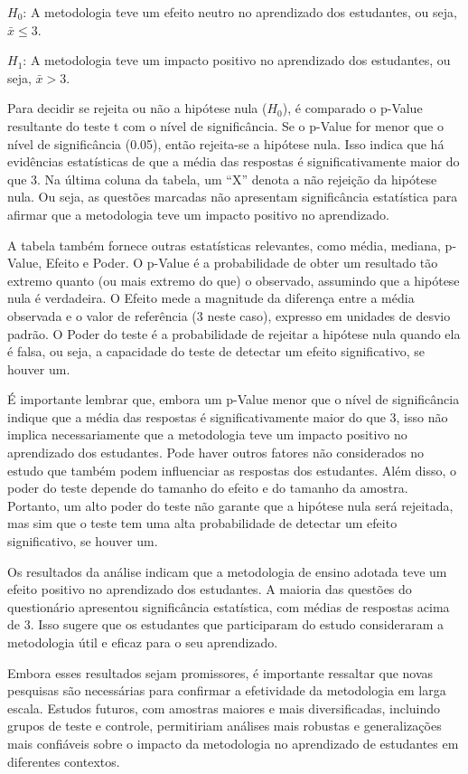 \textbf{\( H_0 \)}: A metodologia teve um efeito neutro no aprendizado dos estudantes, ou seja, \( \bar{x} \leq 3 \).

\textbf{\( H_1 \)}: A metodologia teve um impacto positivo no aprendizado dos estudantes, ou seja, \( \bar{x} > 3 \).

Para decidir se rejeita ou não a hipótese nula (\( H_0 \)), é comparado o p-Value resultante do teste t com o nível de significância. Se o p-Value for menor que o nível de significância (0.05), então rejeita-se a hipótese nula. Isso indica que há evidências estatísticas de que a média das respostas é significativamente maior do que 3. Na última coluna da tabela, um ``X'' denota a não rejeição da hipótese nula. Ou seja, as questões marcadas não apresentam significância estatística para afirmar que a metodologia teve um impacto positivo no aprendizado.

A tabela também fornece outras estatísticas relevantes, como média, mediana, p-Value, Efeito e Poder. O p-Value é a probabilidade de obter um resultado tão extremo quanto (ou mais extremo do que) o observado, assumindo que a hipótese nula é verdadeira. O Efeito mede a magnitude da diferença entre a média observada e o valor de referência (3 neste caso), expresso em unidades de desvio padrão. O Poder do teste é a probabilidade de rejeitar a hipótese nula quando ela é falsa, ou seja, a capacidade do teste de detectar um efeito significativo, se houver um.

É importante lembrar que, embora um p-Value menor que o nível de significância indique que a média das respostas é significativamente maior do que 3, isso não implica necessariamente que a metodologia teve um impacto positivo no aprendizado dos estudantes. Pode haver outros fatores não considerados no estudo que também podem influenciar as respostas dos estudantes. Além disso, o poder do teste depende do tamanho do efeito e do tamanho da amostra. Portanto, um alto poder do teste não garante que a hipótese nula será rejeitada, mas sim que o teste tem uma alta probabilidade de detectar um efeito significativo, se houver um.

Os resultados da análise indicam que a metodologia de ensino adotada teve um efeito positivo no aprendizado dos estudantes. A maioria das questões do questionário apresentou significância estatística, com médias de respostas acima de 3. Isso sugere que os estudantes que participaram do estudo consideraram a metodologia útil e eficaz para o seu aprendizado.

Embora esses resultados sejam promissores, é importante ressaltar que novas pesquisas são necessárias para confirmar a efetividade da metodologia em larga escala. Estudos futuros, com amostras maiores e mais diversificadas, incluindo grupos de teste e controle, permitiriam análises mais robustas e generalizações mais confiáveis sobre o impacto da metodologia no aprendizado de estudantes em diferentes contextos.

